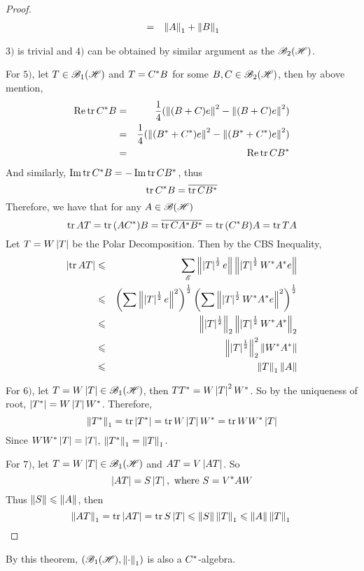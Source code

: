\begin{proof}
\begin{eqnarray*}
		&=& \norm{A}_1 + \norm{B}_1
	\end{eqnarray*}
	\item $3)$ is trivial and $4)$ can be obtained by similar argument as the $\hoper$.
	\item For $5)$, let $T \in \toper$ and $T = \st{C}B$ for some $B,C \in \hoper$, then by above mention,
	\begin{eqnarray*}
		\Rea{\tr{\st{C}B}} &=& \frac{1}{4} (\norm{(B+C)e}^2 - \norm{(B+C)e}^2) \\
		&=& \frac{1}{4} (\norm{(\st{B}+\st{C})e}^2 - \norm{(\st{B}+\st{C})e}^2) \\
		&=& \Rea{\tr{C\st{B}}}
	\end{eqnarray*}
	And similarly, $\Img{\tr{\st{C}B}} = - \Img{\tr{C\st{B}}}$, thus
	\begin{equation*}
		\tr{\st{C}B} = \clo{\tr{C\st{B}}}
	\end{equation*}
	Therefore, we have that for any $A \in \oper$ 
	\begin{equation*}
		\tr{AT} = \tr{(A\st{C})B} = \clo{\tr{C\st{A} \st{B}}} = \tr{(\st{C}B)A} = \tr{TA}
	\end{equation*}
	Let $T = W \abs{T}$ be the Polar Decomposition. Then by the CBS Inequality,
	\begin{eqnarray*}
		\abs{\tr{AT}} &\leqslant& \sum_{\fml{E}}  \norm{\abs{T}^{\frac{1}{2}}e}\norm{\abs{T}^{\frac{1}{2}}\st{W}\st{A}e} \\
		&\leqslant& \left(\sum \norm{\abs{T}^{\frac{1}{2}}e}^2 \right)^{\frac{1}{2}}\left(\sum \norm{\abs{T}^{\frac{1}{2}}\st{W}\st{A}e}^2 \right)^{\frac{1}{2}} \\
		&\leqslant& \norm{\abs{T}^{\frac{1}{2}}}_2\norm{\abs{T}^{\frac{1}{2}}\st{W}\st{A}}_2 \\
		&\leqslant& \norm{\abs{T}^{\frac{1}{2}}}_2^2 \norm{\st{W}\st{A}} \\
		&\leqslant& \norm{T}_1 \norm{A}
	\end{eqnarray*}	
	\item For $6)$, let $T = W \abs{T} \in \toper$, then $T\st{T} = W \abs{T}^2 \st{W}$. So by the uniqueness of root, $\abs{\st{T}} = W \abs{T} \st{W}$. Therefore,
	\begin{equation*}
		\norm{\st{T}}_1 = \tr{\abs{\st{T}}} = \tr{W \abs{T} \st{W}} = \tr{W \st{W} \abs{T}}
	\end{equation*} 
	Since $W \st{W} \abs{T} = \abs{T}$, $\norm{\st{T}}_1 = \norm{T}_1$.
	\item For $7)$, let $T = W \abs{T} \in \toper$ and $AT = V \abs{AT}$. So
	\begin{equation*}
		\abs{AT} = S \abs{T}, \text{ where } S = \st{V}A W
	\end{equation*}
	Thus $\norm{S} \leqslant \norm{A}$, then
	\begin{equation*}
		\norm{AT}_1 = \tr{\abs{AT}} = \tr{S \abs{T}} \leqslant \norm{S} \norm{T}_1 \leqslant \norm{A}\norm{T}_1 \qedhere
	\end{equation*}
\end{proof}
\begin{rem}
	By this theorem, $(\toper, \norm{\cdot}_1)$ is also a $\st{C}$-algebra.
\end{rem}

